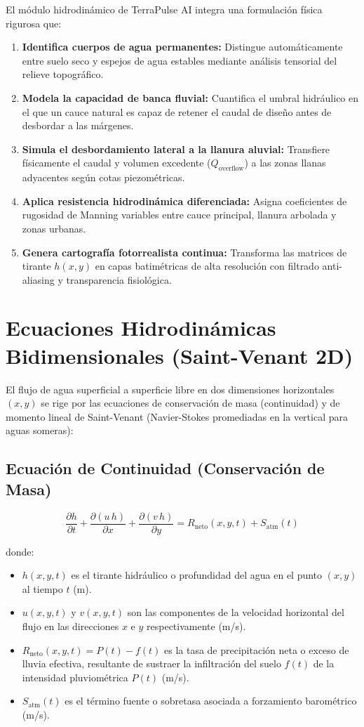 \documentclass[11pt,a4paper]{article}
\begin{document}
El módulo hidrodinámico de TerraPulse AI integra una formulación física rigurosa que:
\begin{enumerate}
  \item \textbf{Identifica cuerpos de agua permanentes:} Distingue automáticamente entre suelo seco y espejos de agua estables mediante análisis tensorial del relieve topográfico.
  \item \textbf{Modela la capacidad de banca fluvial:} Cuantifica el umbral hidráulico en el que un cauce natural es capaz de retener el caudal de diseño antes de desbordar a las márgenes.
  \item \textbf{Simula el desbordamiento lateral a la llanura aluvial:} Transfiere físicamente el caudal y volumen excedente ($Q_{\text{overflow}}$) a las zonas llanas adyacentes según cotas piezométricas.
  \item \textbf{Aplica resistencia hidrodinámica diferenciada:} Asigna coeficientes de rugosidad de Manning variables entre cauce principal, llanura arbolada y zonas urbanas.
  \item \textbf{Genera cartografía fotorrealista continua:} Transforma las matrices de tirante $h(x,y)$ en capas batimétricas de alta resolución con filtrado anti-aliasing y transparencia fisiológica.
\end{enumerate}

\section{Ecuaciones Hidrodinámicas Bidimensionales (Saint-Venant 2D)}

El flujo de agua superficial a superficie libre en dos dimensiones horizontales $(x, y)$ se rige por las ecuaciones de conservación de masa (continuidad) y de momento lineal de Saint-Venant (Navier-Stokes promediadas en la vertical para aguas someras):

\subsection{Ecuación de Continuidad (Conservación de Masa)}

\begin{equation}
  \frac{\partial h}{\partial t} + \frac{\partial (u\,h)}{\partial x} + \frac{\partial (v\,h)}{\partial y} = R_{\text{neto}}(x,y,t) + S_{\text{atm}}(t)
\end{equation}

donde:
\begin{itemize}
  \item $h(x,y,t)$ es el tirante hidráulico o profundidad del agua en el punto $(x,y)$ al tiempo $t$ (m).
  \item $u(x,y,t)$ y $v(x,y,t)$ son las componentes de la velocidad horizontal del flujo en las direcciones $x$ e $y$ respectivamente (m/s).
  \item $R_{\text{neto}}(x,y,t) = P(t) - f(t)$ es la tasa de precipitación neta o exceso de lluvia efectiva, resultante de sustraer la infiltración del suelo $f(t)$ de la intensidad pluviométrica $P(t)$ (m/s).
  \item $S_{\text{atm}}(t)$ es el término fuente o sobretasa asociada a forzamiento barométrico (m/s).
\end{itemize}
\end{document}
